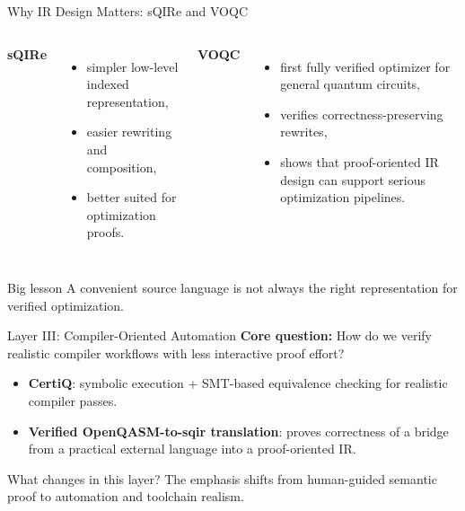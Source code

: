 \documentclass[aspectratio=169]{beamer}
\begin{document}
\begin{frame}{Why IR Design Matters: sQIRe and VOQC}
\justifying
\begin{columns}[T]
\textbf{sQIRe}
\begin{itemize}
    \item simpler low-level indexed representation,
    \item easier rewriting and composition,
    \item better suited for optimization proofs.
\end{itemize}

\textbf{VOQC}
\begin{itemize}
    \item first fully verified optimizer for general quantum circuits,
    \item verifies correctness-preserving rewrites,
    \item shows that proof-oriented IR design can support serious optimization pipelines.
\end{itemize}
\end{columns}

\vspace{1em}
\begin{alertblock}{Big lesson}
A convenient source language is not always the right representation for verified optimization.
\end{alertblock}
\end{frame}

\begin{frame}{Layer III: Compiler-Oriented Automation}
\justifying
\textbf{Core question:} How do we verify realistic compiler workflows with less interactive proof effort?

\vspace{0.5em}
\begin{itemize}
    \item \textbf{CertiQ}: symbolic execution + SMT-based equivalence checking for realistic compiler passes.
    \item \textbf{Verified OpenQASM-to-sqir translation}: proves correctness of a bridge from a practical external language into a proof-oriented IR.
\end{itemize}

\pause

\begin{block}{What changes in this layer?}
The emphasis shifts from human-guided semantic proof to automation and toolchain realism.
\end{block}
\end{frame}
\end{document}
